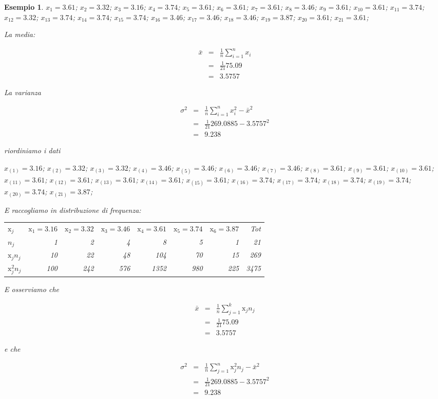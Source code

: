 \documentclass[
  11pt,
]{book}
\theoremstyle{mytheoremstyle}
\theoremstyle{mydefstyle}
\newtheorem{example}{{Esempio}}[section]
\begin{document}
\begin{example}
\(x_{1}=3.61\); \(x_{2}=3.32\); \(x_{3}=3.16\); \(x_{4}=3.74\); \(x_{5}=3.61\); \(x_{6}=3.61\); \(x_{7}=3.61\); \(x_{8}=3.46\); \(x_{9}=3.61\); \(x_{10}=3.61\); \(x_{11}=3.74\); \(x_{12}=3.32\); \(x_{13}=3.74\); \(x_{14}=3.74\); \(x_{15}=3.74\); \(x_{16}=3.46\); \(x_{17}=3.46\); \(x_{18}=3.46\); \(x_{19}=3.87\); \(x_{20}=3.61\); \(x_{21}=3.61\);

La media:

\begin{eqnarray*}
\bar x &=& \frac 1 n \sum_{i=1}^n x_i \\
       &=& \frac 1 {21} 75.09\\
       &=& 3.5757
\end{eqnarray*}

La varianza

\begin{eqnarray*}
\sigma^2 &=& \frac 1 n \sum_{i=1}^n x_i^2 - \bar x ^2 \\
       &=& \frac 1 {21} 269.0885 - 3.5757^2\\
       &=& 9.238
\end{eqnarray*}

riordiniamo i dati

\(x_{(1)}=3.16\); \(x_{(2)}=3.32\); \(x_{(3)}=3.32\); \(x_{(4)}=3.46\); \(x_{(5)}=3.46\); \(x_{(6)}=3.46\); \(x_{(7)}=3.46\); \(x_{(8)}=3.61\); \(x_{(9)}=3.61\); \(x_{(10)}=3.61\); \(x_{(11)}=3.61\); \(x_{(12)}=3.61\); \(x_{(13)}=3.61\); \(x_{(14)}=3.61\); \(x_{(15)}=3.61\); \(x_{(16)}=3.74\); \(x_{(17)}=3.74\); \(x_{(18)}=3.74\); \(x_{(19)}=3.74\); \(x_{(20)}=3.74\); \(x_{(21)}=3.87\);

E raccogliamo in distribuzione di frequenza:

\begin{tabular}{lrrrrrr|>{}r}
\toprule
$\mathrm{x}_j$ & $\mathrm{x}_1=3.16$ & $\mathrm{x}_2=3.32$ & $\mathrm{x}_3=3.46$ & $\mathrm{x}_4=3.61$ & $\mathrm{x}_5=3.74$ & $\mathrm{x}_6=3.87$ & Tot\\
$n_j$ & 1 & 2 & 4 & 8 & 5 & 1 & 21\\
$\mathrm{x}_j n_j$ & 10 & 22 & 48 & 104 & 70 & 15 & 269\\
$\mathrm{x}_j^2 n_j$ & 100 & 242 & 576 & 1352 & 980 & 225 & 3475\\
\bottomrule
\end{tabular}

E osserviamo che

\begin{eqnarray*}
\bar x &=& \frac 1 n \sum_{j=1}^k \mathrm{x}_j n_j \\
       &=& \frac 1 {21} 75.09\\
       &=& 3.5757
\end{eqnarray*}

e che

\begin{eqnarray*}
\sigma^2 &=& \frac 1 n \sum_{j=1}^n \mathrm{x}_j^2 n_j - \bar x ^2 \\
       &=& \frac 1 {21} 269.0885 - 3.5757^2\\
       &=& 9.238
\end{eqnarray*}
\end{example}
\end{document}
